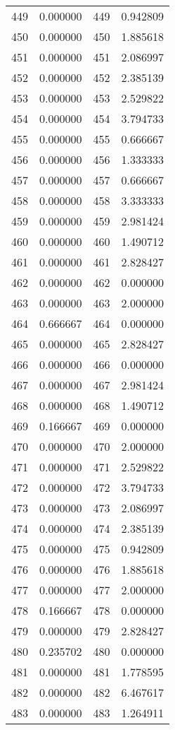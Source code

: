 \documentclass[12pt]{article}
\begin{document}
\begin{longtable}{@{}cccc@{}}
449 & 0.000000 & 449 & 0.942809 \\
450 & 0.000000 & 450 & 1.885618 \\
451 & 0.000000 & 451 & 2.086997 \\
452 & 0.000000 & 452 & 2.385139 \\
453 & 0.000000 & 453 & 2.529822 \\
454 & 0.000000 & 454 & 3.794733 \\
455 & 0.000000 & 455 & 0.666667 \\
456 & 0.000000 & 456 & 1.333333 \\
457 & 0.000000 & 457 & 0.666667 \\
458 & 0.000000 & 458 & 3.333333 \\
459 & 0.000000 & 459 & 2.981424 \\
460 & 0.000000 & 460 & 1.490712 \\
461 & 0.000000 & 461 & 2.828427 \\
462 & 0.000000 & 462 & 0.000000 \\
463 & 0.000000 & 463 & 2.000000 \\
464 & 0.666667 & 464 & 0.000000 \\
465 & 0.000000 & 465 & 2.828427 \\
466 & 0.000000 & 466 & 0.000000 \\
467 & 0.000000 & 467 & 2.981424 \\
468 & 0.000000 & 468 & 1.490712 \\
469 & 0.166667 & 469 & 0.000000 \\
470 & 0.000000 & 470 & 2.000000 \\
471 & 0.000000 & 471 & 2.529822 \\
472 & 0.000000 & 472 & 3.794733 \\
473 & 0.000000 & 473 & 2.086997 \\
474 & 0.000000 & 474 & 2.385139 \\
475 & 0.000000 & 475 & 0.942809 \\
476 & 0.000000 & 476 & 1.885618 \\
477 & 0.000000 & 477 & 2.000000 \\
478 & 0.166667 & 478 & 0.000000 \\
479 & 0.000000 & 479 & 2.828427 \\
480 & 0.235702 & 480 & 0.000000 \\
481 & 0.000000 & 481 & 1.778595 \\
482 & 0.000000 & 482 & 6.467617 \\
483 & 0.000000 & 483 & 1.264911 \\

\end{longtable}
\end{document}
